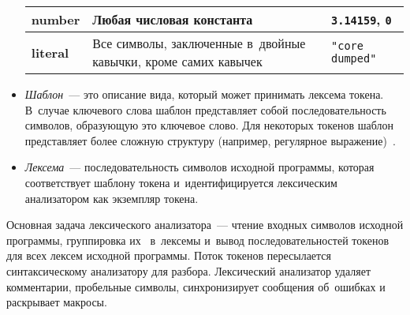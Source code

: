 \begin{itemize}
{\begin{table} [h!tbp]
\begin{tabular}{| p{3cm} | p{6cm} | p{5cm} |}
				\textbf{number}  	& 	Любая числовая константа													& 	\texttt{3.14159}, \texttt{0} 				\\ \hline
				\textbf{literal}  	& 	Все символы, заключенные в~двойные кавычки, кроме самих кавычек				& 	\texttt{"core dumped"} 						\\ \hline	
			\end{tabular}
		\end{table}	
	}
	\item{\textit{Шаблон}~--- это описание вида, который может принимать лексема токена. В~случае ключевого слова шаблон представляет собой последовательность символов, образующую это ключевое слово. Для некоторых токенов шаблон представляет более сложную структуру (например, регулярное выражение)~\cite{web2}.}
	\item{\textit{Лексема}~--- последовательность символов исходной программы, которая соответствует шаблону токена и~идентифицируется лексическим анализатором как экземпляр токена.}
\end{itemize}

Основная задача лексического анализатора~--- чтение входных символов исходной программы, группировка их ~в~лексемы и~вывод последовательностей токенов для всех лексем исходной программы. Поток токенов пересылается синтаксическому анализатору для разбора. Лексический анализатор удаляет комментарии, пробельные символы, синхронизирует сообщения об~ошибках и раскрывает макросы.